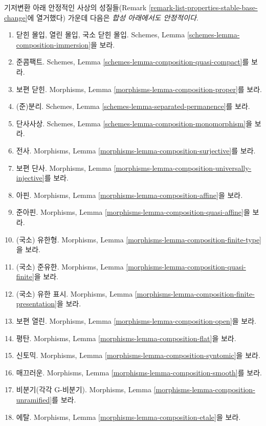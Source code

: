 \begin{remark}
\label{remark-list-properties-stable-composition}
기저변환 아래 안정적인 사상의 성질들(Remark
\ref{remark-list-properties-stable-base-change}에 열거했다) 가운데
다음은 {\it 합성 아래에서도 안정적이다}.
\begin{enumerate}
\item 닫힌 몰입, 열린 몰입, 국소 닫힌 몰입. Schemes, Lemma
\ref{schemes-lemma-composition-immersion}을 보라.
\item 준콤팩트. Schemes, Lemma
\ref{schemes-lemma-composition-quasi-compact}를 보라.
\item 보편 닫힌. Morphisms, Lemma
\ref{morphisms-lemma-composition-proper}를 보라.
\item (준)분리. Schemes, Lemma
\ref{schemes-lemma-separated-permanence}를 보라.
\item 단사사상. Schemes, Lemma
\ref{schemes-lemma-composition-monomorphism}을 보라.
\item 전사. Morphisms, Lemma
\ref{morphisms-lemma-composition-surjective}를 보라.
\item 보편 단사. Morphisms, Lemma
\ref{morphisms-lemma-composition-universally-injective}를 보라.
\item 아핀. Morphisms, Lemma
\ref{morphisms-lemma-composition-affine}을 보라.
\item 준아핀. Morphisms, Lemma
\ref{morphisms-lemma-composition-quasi-affine}을 보라.
\item (국소) 유한형. Morphisms, Lemma
\ref{morphisms-lemma-composition-finite-type}을 보라.
\item (국소) 준유한. Morphisms, Lemma
\ref{morphisms-lemma-composition-quasi-finite}을 보라.
\item (국소) 유한 표시. Morphisms, Lemma
\ref{morphisms-lemma-composition-finite-presentation}을 보라.
\item 보편 열린. Morphisms, Lemma
\ref{morphisms-lemma-composition-open}을 보라.
\item 평탄. Morphisms, Lemma
\ref{morphisms-lemma-composition-flat}을 보라.
\item 신토믹. Morphisms, Lemma
\ref{morphisms-lemma-composition-syntomic}을 보라.
\item 매끄러운. Morphisms, Lemma
\ref{morphisms-lemma-composition-smooth}를 보라.
\item 비분기(각각 G-비분기). Morphisms, Lemma
\ref{morphisms-lemma-composition-unramified}를 보라.
\item 에탈. Morphisms, Lemma
\ref{morphisms-lemma-composition-etale}을 보라.

\end{enumerate}
\end{remark}
